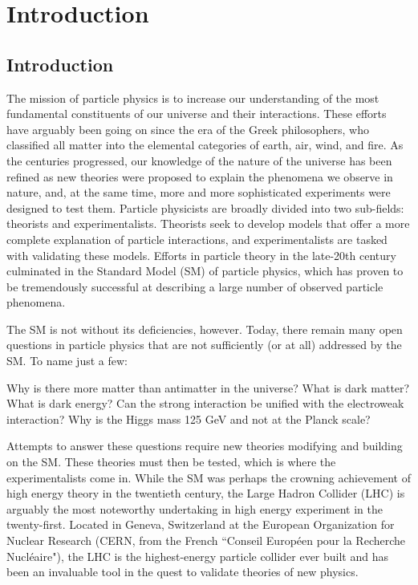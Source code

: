 \chapter{Introduction}

\section{Introduction}\label{sec:intro}

The mission of particle physics is to increase our understanding of the most fundamental constituents of our universe and their interactions. These efforts have arguably been going on since the era of the Greek philosophers, who classified all matter into the elemental categories of earth, air, wind, and fire. As the centuries progressed, our knowledge of the nature of the universe has been refined as new theories were proposed to explain the phenomena we observe in nature, and, at the same time, more and more sophisticated experiments were designed to test them. Particle physicists are broadly divided into two sub-fields: theorists and experimentalists. Theorists seek to develop models that offer a more complete explanation of particle interactions, and experimentalists are tasked with validating these models. Efforts in particle theory in the late-20th century culminated in the Standard Model (SM) of particle physics, which has proven to be tremendously successful at describing a large number of observed particle phenomena.

The SM is not without its deficiencies, however. Today, there remain many open questions in particle physics that are not sufficiently (or at all) addressed by the SM. To name just a few: 

Why is there more matter than antimatter in the universe?
What is dark matter?
What is dark energy?
Can the strong interaction be unified with the electroweak interaction?
Why is the Higgs mass 125 GeV and not at the Planck scale?

Attempts to answer these questions require new theories modifying and building on the SM. These theories must then be tested, which is where the experimentalists come in. While the SM was perhaps the crowning achievement of high energy theory in the twentieth century, the Large Hadron Collider (LHC) is arguably the most noteworthy undertaking in high energy experiment in the twenty-first. Located in Geneva, Switzerland at the European Organization for Nuclear Research (CERN, from the French ``Conseil Européen pour la Recherche Nucléaire"), the LHC is the highest-energy particle collider ever built and has been an invaluable tool in the quest to validate theories of new physics.

